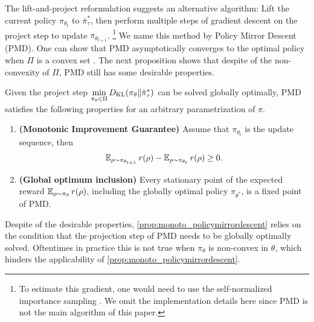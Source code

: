 The lift-and-project reformulation suggests an alternative algorithm: Lift the current policy $\pi_{\theta_t}$ to $\bar{\pi}_\tau^*$, then perform multiple steps of gradient descent on the project step to update $\pi_{\theta_{t+1}}$. \footnote{To estimate this gradient, one would need to use the self-normalized importance sampling \cite{owen2013monte}. We omit the implementation details here since PMD  is not the main algorithm of this paper.}
We name this method by Policy Mirror Descent (PMD).  
One can show that PMD asymptotically converges to the optimal policy when $\Pi$ is a convex set \citep{nemirovskii1983problem,beck2003mirror}. 
The next proposition shows that despite of the non-convexity of $\Pi$, PMD still has some desirable properties.
\begin{prop}
\label{prop:monoto_policymirrordescent}
Given the project step $\min\limits_{\pi_\theta \in \Pi}{D_{\mathrm{KL}}( \pi_\theta \| \bar{\pi}_{\tau}^* )}$ can be solved globally optimally, PMD satisfies the following properties for an arbitrary parametrization of $\pi$.
\begin{enumerate}
	\item {\bf (Monotonic Improvement Guarantee)} 
	Assume that $\pi_{\theta_{t}}$ is the update sequence, then 
	 \begin{equation*}
	\operatorname{\mathbb{E}}_{\rho \sim \pi_{\theta_{t+1}}}{r(\rho)} - \operatorname{\mathbb{E}}_{\rho \sim \pi_{\theta_{t}}}{  r(\rho)} \ge 0.
	\end{equation*}
	\item {\bf (Global optimum inclusion)} Every stationary point of the expected reward $\operatorname{\mathbb{E}}_{\rho \sim \pi_\theta}{  r(\rho)}$, including the globally optimal policy $\pi_{\theta^*}$,  is a fixed point of PMD.
\end{enumerate}
\end{prop}

Despite of the desirable properties, 
\cref{prop:monoto_policymirrordescent}
relies on the condition that the projection step of PMD needs to be globally optimally solved.
Oftentimes in practice this is not true when $\pi_\theta$ is non-convex in $\theta$, which hinders the applicability of \cref{prop:monoto_policymirrordescent}.

